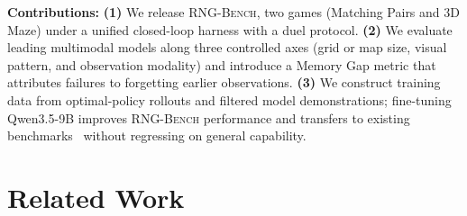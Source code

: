 \documentclass{llmxive}
\providecommand{\benchname}{\textsc{RNG-Bench}\xspace}
\providecommand{\paragraph}[1]{\vspace{1mm}\noindent\textbf{#1}}
\begin{document}

\noindent \textbf{Contributions:} \textbf{(1)} We release \benchname{}, two games (Matching Pairs and 3D Maze) under a unified closed-loop harness with a duel protocol. \textbf{(2)} We evaluate leading multimodal models along three controlled axes (grid or map size, visual pattern, and observation modality) and introduce a Memory Gap metric that attributes failures to forgetting earlier observations. \textbf{(3)} We construct training data from optimal-policy rollouts and filtered model demonstrations; fine-tuning Qwen3.5-9B improves \benchname{} performance and transfers to existing benchmarks~\citep{li2026emembench,ren2025vgrp} without regressing on general capability.
\section{Related Work}
\label{sec:related}

\end{document}
